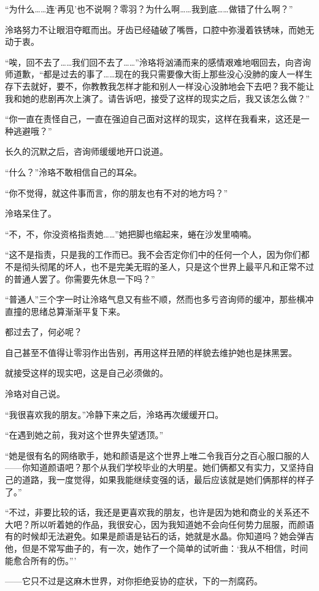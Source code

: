 \documentclass[UTF8, scheme = chinese, openany]{ctexbook}
\begin{document}
“为什么……连‘再见’也不说啊？零羽？为什么啊……我到底……做错了什么啊？”

泠珞努力不让眼泪夺眶而出。牙齿已经磕破了嘴唇，口腔中弥漫着铁锈味，而她无动于衷。

“唉，回不去了……我们回不去了……”泠珞将汹涌而来的感情艰难地咽回去，向咨询师道歉，“都是过去的事了……现在的我只需要像大街上那些没心没肺的废人一样生存下去就好，要不，你教教我怎样才能和别人一样没心没肺地会下去吧？我不能让我和她的悲剧再次上演了。请告诉吧，接受了这样的现实之后，我又该怎么做？”

“你一直在责怪自己，一直在强迫自己面对这样的现实，这样在我看来，这还是一种逃避哦？”

长久的沉默之后，咨询师缓缓地开口说道。

“什么？”泠珞不敢相信自己的耳朵。

“你不觉得，就这件事而言，你的朋友也有不对的地方吗？”

泠珞呆住了。

“不，不，你没资格指责她……”她把脚也缩起来，蜷在沙发里喃喃。

“这不是指责，只是我的工作而已。我不会否定你们中的任何一个人，因为你们都不是彻头彻尾的坏人，也不是完美无瑕的圣人，只是这个世界上最平凡和正常不过的普通人罢了。你需要先休息一下吗？”

“普通人”三个字一时让泠珞气息又有些不顺，然而也多亏咨询师的缓冲，那些横冲直撞的思绪总算渐渐平复下来。

都过去了，何必呢？

自己甚至不值得让零羽作出告别，再用这样丑陋的样貌去维护她也是抹黑罢。

就接受这样的现实吧，这是自己必须做的。

泠珞对自己说。

“我很喜欢我的朋友。”冷静下来之后，泠珞再次缓缓开口。

“在遇到她之前，我对这个世界失望透顶。”

“她是很有名的网络歌手，她和颜语是这个世界上唯二令我百分之百心服口服的人——你知道颜语吧？那个从我们学校毕业的大明星。她们俩都又有实力，又坚持自己的道路，我一度觉得，如果我能继续变强的话，最后应该就是她们俩那样的样子了。”

“不过，非要比较的话，我还是更喜欢我的朋友，也许是因为她和商业的关系还不大吧？所以听着她的作品，我很安心，因为我知道她不会向任何势力屈服，而颜语有的时候却无法避免。如果是颜语是钻石的话，她就是水晶。你知道吗？她会弹吉他，但是不常写曲子的，有一次，她作了一个简单的试听曲：‘我从不相信，时间能愈合所有的伤。”’

——它只不过是这麻木世界，对你拒绝妥协的症状，下的一剂腐药。
\end{document}
